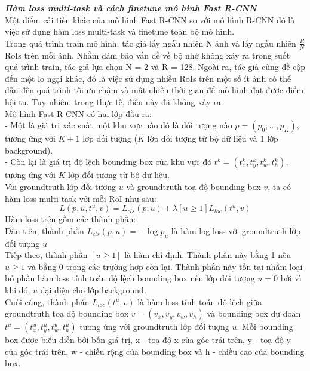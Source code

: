{        \noindent
        \textbf{\textit{Hàm loss multi-task và cách finetune mô hình Fast R-CNN}} \\
        Một điểm cải tiến khác của mô hình Fast R-CNN so với mô hình R-CNN đó là việc sử dụng hàm loss multi-task và finetune toàn bộ mô hình. \\
        Trong quá trình train mô hình, tác giả lấy ngẫu nhiên N ảnh và lấy ngẫu nhiên $\frac{R}{N}$ RoIs trên mỗi ảnh.
        Nhằm đảm bảo vấn đề về bộ nhớ không xảy ra trong suốt quá trình train, tác giả lựa chọn N = 2 và R = 128.
        Ngoài ra, tác giả cũng đề cập đến một lo ngại khác, đó là việc sử dụng nhiều RoIs trên một số ít ảnh có thể dẫn đến quá trình tối ưu chậm và mất nhiều thời gian để mô hình đạt được điểm hội tụ.
        Tuy nhiên, trong thực tế, điều này đã không xảy ra. \\
        Mô hình Fast R-CNN có hai lớp đầu ra: \\
        - Một là giá trị xác suất một khu vực nào đó là đối tượng nào $p = (p_0, \dots, p_K)$, tương ứng với $K + 1$ lớp đối tượng ($K$ lớp đối tượng từ bộ dữ liệu và 1 lớp background). \\
        - Còn lại là giá trị độ lệch bounding box của khu vực đó $t^{k} = (t^{k}_{x}, t^{k}_{y}, t^{k}_{w}, t^{k}_{h})$, tương ứng với $K$ lớp đối tượng từ bộ dữ liệu. \\
        Với groundtruth lớp đối tượng $u$ và groundtruth toạ độ bounding box $v$, ta có hàm loss multi-task với mỗi RoI như sau:
        \begin{equation}
            \label{eq:fast_rcnn_loss}
            L(p, u, t^u, v) = L_{cls}(p, u) + \lambda [u \ge 1] L_{loc}(t^u, v)
        \end{equation}
        Hàm loss trên gồm các thành phần: \\
        Đầu tiên, thành phần $L_{cls}(p, u) = -\log p_u$ là hàm log loss với groundtruth lớp đối tượng $u$ \\
        Tiếp theo, thành phần $[u \ge 1]$ là hàm chỉ định. Thành phần này bằng 1 nếu $u \ge 1$ và bằng 0 trong các trường hợp còn lại. Thành phần này tồn tại nhằm loại bỏ phần hàm loss tính toán độ lệch bounding box nếu lớp đối tượng $u = 0$ bởi vì khi đó, $u$ đại diện cho lớp background. \\
        Cuối cùng, thành phần $L_{loc}(t^u, v)$ là hàm loss tính toán độ lệch giữa groundtruth toạ độ bounding box $v = (v_{x}, v_{y}, v_{w}, v_{h})$ và bounding box dự đoán $t^u = (t^u_{x}, t^u_{y}, t^u_{w}, t^u_{h})$ tương ứng với groundtruth lớp đối tượng $u$. Mỗi bounding box được biểu diễn bởi bốn giá trị, x - toạ độ x của góc trái trên, y - toạ độ y của góc trái trên, w - chiều rộng của bounding box và h - chiều cao của bounding box.
}
